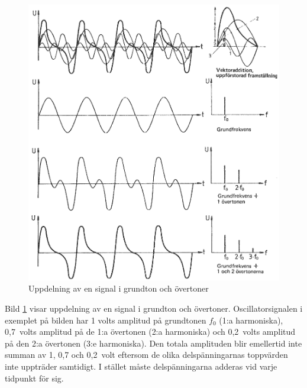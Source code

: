 \begin{figure}
\begin{center}
\includegraphics[width=\textwidth]{images/cropped_pdfs/bild_2_1-19.pdf}
\caption{Uppdelning av en signal i grundton och övertoner}
\label{fig:BildII1-19}
\end{center}
\end{figure}

Bild \ref{fig:BildII1-19} visar uppdelning av en signal i grundton och
övertoner.
Oscillatorsignalen i exemplet på bilden har 1 volts amplitud på grundtonen
\(f_0\) (1:a harmoniska), 0,7~volts amplitud på de 1:a övertonen
(2:a harmoniska) och 0,2~volts amplitud på den 2:a övertonen (3:e harmoniska).
Den totala amplituden blir emellertid inte summan av 1, 0,7 och 0,2~volt
eftersom de olika delspänningarnas toppvärden inte uppträder samtidigt.
I stället måste delspänningarna adderas vid varje tidpunkt för sig.

